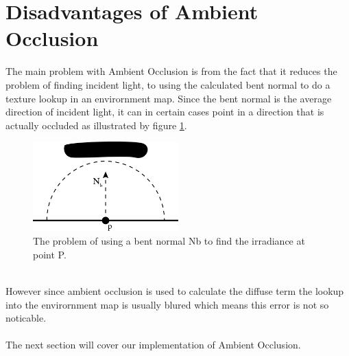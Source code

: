 \section{Disadvantages of Ambient Occlusion}
The main problem with Ambient Occlusion is from the fact that it reduces the problem of finding incident light, to using the calculated bent normal to do a texture lookup in an envirornment map. Since the bent normal is the average direction of incident light, it can in certain cases point in a direction that is actually occluded as illustrated by figure \ref{fig:bent_normal}.
\\
\begin{figure}[h!]
	\centering
	\includegraphics[width=0.5\textwidth]{Theory/bentNormalProblems}
\caption{The problem of using a bent normal Nb to find the irradiance at point P.}	\label{fig:bent_normal}
\end{figure}
\\ 
However since ambient occlusion is used to calculate the diffuse term the lookup into the envirornment map is usually blured which means this error is not so noticable.
\\ \\
The next section will cover our implementation of Ambient Occlusion.